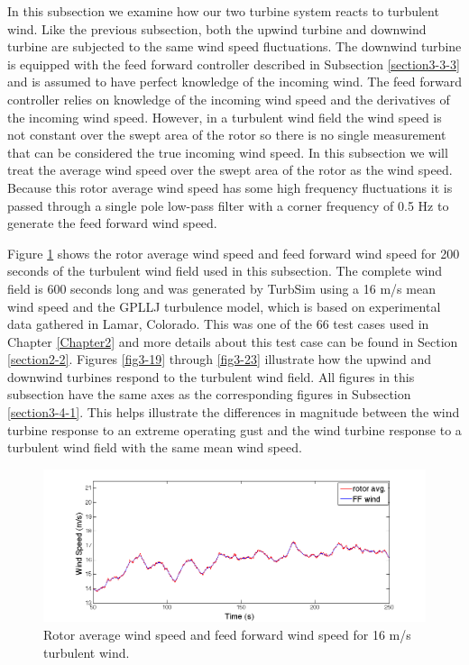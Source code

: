 In this subsection we examine how our two turbine system reacts to turbulent wind. Like the previous subsection, both the upwind turbine and downwind turbine are subjected to the same wind speed fluctuations. The downwind turbine is equipped with the feed forward controller described in Subsection \ref{section3-3-3} and is assumed to have perfect knowledge of the incoming wind. The feed forward controller relies on knowledge of the incoming wind speed and the derivatives of the incoming wind speed. However, in a turbulent wind field the wind speed is not constant over the swept area of the rotor so there is no single measurement that can be considered the true incoming wind speed. In this subsection we will treat the average wind speed over the swept area of the rotor as the wind speed. Because this rotor average wind speed has some high frequency fluctuations it is passed through a single pole low-pass filter with a corner frequency of 0.5 Hz to generate the feed forward wind speed.

Figure \ref{fig3-18} shows the rotor average wind speed and feed forward wind speed for 200 seconds of the turbulent wind field used in this subsection. The complete wind field is 600 seconds long and was generated by TurbSim using a 16 m/s mean wind speed and the GPLLJ turbulence model, which is based on experimental data gathered in Lamar, Colorado. This was one of the 66 test cases used in Chapter \ref{Chapter2} and more details about this test case can be found in Section \ref{section2-2}. Figures \ref{fig3-19} through \ref{fig3-23} illustrate how the upwind and downwind turbines respond to the turbulent wind field. All figures in this subsection have the same axes as the corresponding figures in Subsection \ref{section3-4-1}. This helps illustrate the differences in magnitude between the wind turbine response to an extreme operating gust and the wind turbine response to a turbulent wind field with the same mean wind speed.

\begin{figure}[htb]
	\centering
		\includegraphics[width = \linewidth]{Figures/ch3Figures/fig3-18.png}
		
	\caption{Rotor average wind speed and feed forward wind speed for 16 m/s turbulent wind.}
	\label{fig3-18}
\end{figure}

